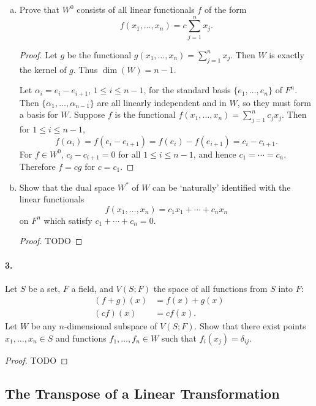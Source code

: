 \documentclass{article}
\begin{document}
\begin{enumerate}[(a)]
  \item Prove that $W^0$ consists of all linear functionals $f$ of the form \[
      f(x_1, \ldots, x_n) = c\sum_{j=1}^n x_j.
    \]
    \begin{proof}
      Let $g$ be the functional $g(x_1, \ldots, x_n) = \sum_{j=1}^n x_j$. Then
      $W$ is exactly the kernel of $g$. Thus $\dim(W) = n - 1$.

      Let $\alpha_i = e_i - e_{i+1}$, $1 \leq i \leq n - 1$, for the standard
      basis $\{e_1, \ldots, e_n\}$ of $F^n$. Then $\{\alpha_1, \ldots,
      \alpha_{n-1}\}$ are all linearly independent and in $W$, so they must form
      a basis for $W$. Suppose $f$ is the functional $f(x_1, \ldots, x_n) =
      \sum_{j=1}^n c_jx_j$. Then for $1 \leq i \leq n - 1$, \[
        f(\alpha_i) = f(e_i - e_{i+1}) = f(e_i) - f(e_{i+1}) = c_i - c_{i+1}.
      \] For $f \in W^0$, $c_i - c_{i+1} = 0$ for all $1 \leq i \leq n - 1$, and
      hence $c_1 = \cdots = c_n$. Therefore $f = cg$ for $c = c_1$.
    \end{proof}
  \item Show that the dual space $W^*$ of $W$ can be `naturally' identified with
    the linear functionals \[
      f(x_1, \ldots, x_n) = c_1x_1 + \cdots + c_nx_n
    \] on $F^n$ which satisfy $c_1 + \cdots + c_n = 0$.
    \begin{proof}
      TODO
    \end{proof}
\end{enumerate}

\paragraph{3.} Let $S$ be a set, $F$ a field, and $V(S; F)$ the space of all
functions from $S$ into $F$:
\begin{align*}
  (f + g)(x) &= f(x) + g(x) \\
  (cf)(x) &= cf(x).
\end{align*}
Let $W$ be any $n$-dimensional subspace of $V(S; F)$. Show that there exist
points $x_1, \ldots, x_n \in S$ and functions $f_1, \ldots, f_n \in W$ such that
$f_i(x_j) = \delta_{ij}$.

\begin{proof}
  TODO
\end{proof}

\subsection{The Transpose of a Linear Transformation}
\end{document}
